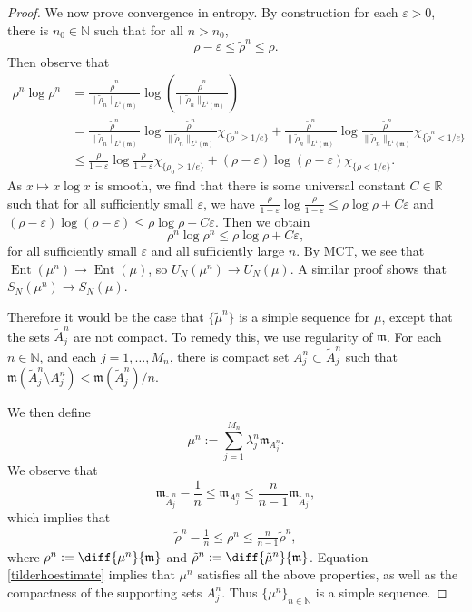 \documentclass{article}
\renewcommand{\epsilon}{\varepsilon}
\newcommand{\R}{\mathbb{R}}
\newcommand{\N}{\mathbb{N}}
\newcommand{\m}{\mathfrak{m}}
\DeclareMathOperator{\Ent}{Ent}
\theoremstyle{definition}
\begin{document}
{\begin{proof}
We now prove convergence in entropy. By construction for each $\epsilon>0$, there is $n_0\in\N$ such that for all $n>n_0$,
\[\rho-\epsilon\leq \tilde\rho^n\leq \rho.\]
Then observe that 
\begin{align*}
\rho^n\log\rho^n &= \frac{\tilde\rho^n}{\|\tilde\rho_n\|_{L^1(\m)}}\log\left(\frac{\tilde\rho^n}{\|\tilde\rho_n\|_{L^1(\m)}}\right)\\
&= \frac{\tilde\rho^n}{\|\tilde\rho_n\|_{L^1(\m)}}
\log\frac{\tilde\rho^n}{\|\tilde\rho_n\|_{L^1(\m)}}\chi_{\{\tilde \rho^n\geq1/e\}}+\frac{\tilde \rho^n}{\|\tilde\rho_n\|_{L^1(\m)}}\log\frac{\tilde \rho^n}{\|\tilde\rho_n\|_{L^1(\m)}}\chi_{\{\tilde\rho^n<1/e\}}\\
&\leq \frac{\rho}{1-\epsilon}
\log\frac{\rho}{1-\epsilon}\chi_{\{\rho_0\geq1/e\}}+(\rho-\epsilon)\log(\rho-\epsilon)\chi_{\{\rho<1/e\}}.
\end{align*}
As $x\mapsto x\log x$ is smooth, we find that there is some universal constant $C\in\R$ such that for all sufficiently small $\epsilon$, we have $\frac{\rho}{1-\epsilon}\log\frac{\rho}{1-\epsilon}\leq \rho\log\rho +C\epsilon$ and $(\rho-\epsilon)\log(\rho-\epsilon)\leq \rho\log\rho+C\epsilon$. Then we obtain 
\[\rho^n\log\rho^n\leq \rho\log\rho+C\epsilon,\]
for all sufficiently small $\epsilon$ and all sufficiently large $n$. By MCT, we see that $\Ent(\mu^n)\to\Ent(\mu)$, so $U_N(\mu^n)\to U_N(\mu)$. A similar proof shows that $S_N(\mu^n)\to S_N(\mu)$. 


Therefore it would be the case that $\{\tilde\mu^n\}$ is a simple sequence for $\mu$, except that the sets $\tilde A_j^n$ are not compact. To remedy this, we use regularity of $\m$. For each $n\in\N$, and each $j=1,\dots, M_n$, there is compact set $A_j^n\subset \tilde A_j^n$ such that $\m(\tilde A_j^n\setminus A_j^n)<\m(\tilde A_j^n)/n$. 

We then define 
\[\mu^n:=\sum_{j=1}^{M_n}\lambda_j^n\m_{A_j^n}.\]
We observe that 
\[\m_{\tilde A_j^n}-\frac1n\leq\m_{A_j^n} \leq \frac{n}{n-1}\m_{\tilde A_j^n},\]
which implies that 
\begin{align}\label{tilderhoestimate}
\tilde \rho^n-\frac 1n\leq \rho^n\leq \frac{n}{n-1}\tilde\rho^n,
\end{align}
where $\rho^n:=\diff{\mu^n}{\m}$ and $\tilde\rho^n:=\diff{\tilde\mu^n}{\m}$. Equation \eqref{tilderhoestimate} implies that $\mu^n$ satisfies all the above properties, as well as the compactness of the supporting sets $A_j^n$. Thus $\{\mu^n\}_{n\in \N}$ is a simple sequence. 
\end{proof}


}
\end{document}
